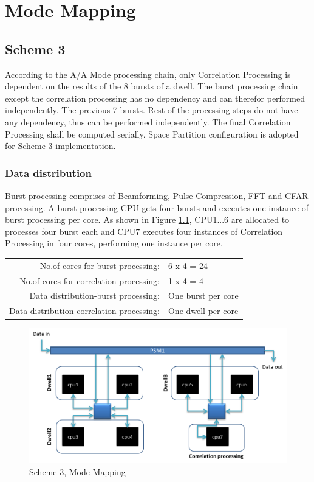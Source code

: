 \chapter{Mode Mapping}
\label{chap:mode_mapping}

\section{Scheme 3}
\label{sec:mm:scheme4}
According to the A/A Mode processing chain, only Correlation Processing is dependent on the results of the 8 bursts of a dwell. The burst processing chain except the correlation processing has no dependency and can therefor performed independently. The previous 7 bursts. Rest of the processing steps do not have any dependency, thus can be performed independently. The final Correlation Processing shall be computed serially. Space Partition configuration is adopted for Scheme-3 implementation.

\subsection{Data distribution}
Burst processing comprises of Beamforming, Pulse Compression, FFT and CFAR processing. A burst processing CPU gets four bursts and executes one instance of burst processing per core. As shown in Figure \ref{fig:mm:scheme4_aa_mode_mapping}, CPU1...6 are allocated to processes four burst each and CPU7 executes four instances of Correlation Processing in four cores, performing one instance per core.

\begin{tabular}{rl}
	No.of cores for burst processing: & 6 x 4 = 24 \\
	No.of cores for correlation processing: & 1 x 4 = 4 \\
	Data distribution-burst processing: & One burst per core \\
	Data distribution-correlation processing: & One dwell per core \\
\end{tabular}

\begin{figure}[h!]
	\centering
	\includegraphics[width=140mm]{figures/scheme4_aa_mode_mapping}
	\caption{Scheme-3, Mode Mapping}
	\label{fig:mm:scheme4_aa_mode_mapping}
\end{figure}

